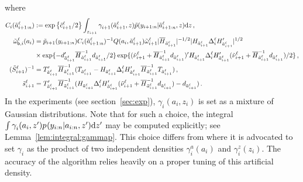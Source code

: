 where
\begin{align*}
C_i(\tilde{a}^{\ell}_{i+1:n}) &:= \exp \left\{\tilde{c}^{\ell}_{i+1}/2\right\}  \int_{z_{i+1}} \gamma^{}_{i+1}(\tilde{a}^{\ell}_{i+1}, z)\tilde{p}(y_{i+1:n}|\tilde{a}^{\ell}_{i+1:n},z) \mathrm{d} z\,,\\
\tilde{\omega}_{\mathsf{b},i}^\ell(a_i) &= \tilde{p}_{i+1}(y_{i+1:n})C_i(\tilde{a}^{\ell}_{i+1:n})^{-1}Q(a_i, \tilde{a}^{\ell}_{i+1}) \tilde{\omega}^{\ell}_{i+1} |\overline{H}_{\tilde{a}^{\ell}_{i+1}}|^{-1/2} |H_{\tilde{a}^{\ell}_{i+1}} \Delta^{\ell}_i H'_{\tilde{a}^{\ell}_{i+1}}|^{1/2}\\
&\times\exp\{-d'_{\tilde{a}^\ell_{i+1}}\overline{H}_{\tilde{a}^\ell_{i+1}}^{-1}d_{\tilde{a}^\ell_{i+1}}/2\}\exp\{(\tilde{\nu}^{\ell}_{i+1} + \overline{H}_{\tilde{a}^\ell_{i+1}}^{-1}d_{\tilde{a}^\ell_{i+1}})'H_{\tilde{a}^{\ell}_{i+1}}\Delta^{\ell}_iH'_{\tilde{a}^{\ell}_{i+1}}(\tilde{\nu}^{\ell}_{i+1} + \overline{H}_{\tilde{a}^\ell_{i+1}}^{-1}d_{\tilde{a}^\ell_{i+1}})/2\} \,,\\
(\tilde{S}_{i+1}^\ell)^{-1} &= T'_{\tilde{a}^{\ell}_{i+1}}\overline{H}_{\tilde{a}^\ell_{i+1}}^{-1}(T_{\tilde{a}^{\ell}_{i+1}}-H_{\tilde{a}^{\ell}_{i+1}}\Delta^{\ell}_iH'_{\tilde{a}^{\ell}_{i+1}}\overline{H}_{\tilde{a}^\ell_{i+1}}^{-1}T_{\tilde{a}^{\ell}_{i+1}})\,,\\
\tilde{s}_{i+1}^\ell &=T'_{\tilde{a}^{\ell}_{i+1}}\overline{H}_{\tilde{a}^\ell_{i+1}}^{-1}(H_{\tilde{a}^{\ell}_{i+1}}\Delta^{\ell}_iH'_{\tilde{a}^{\ell}_{i+1}}(\tilde{\nu}^{\ell}_{i+1} + \overline{H}_{\tilde{a}^\ell_{i+1}}^{-1}d_{\tilde{a}^\ell_{i+1}})-d_{\tilde{a}^\ell_{i+1}})\,.
\end{align*}
In the experiments (see section~\ref{sec:exp}), $\gamma^{}_i(a_i,z_i)$ is set as a mixture of Gaussian distributions. Note that for such a choice,
 the integral $\int \gamma^{}_{i}(a_i,z')p_{}(y_{i:n}|a_{i:n},z')\mathrm{d} z'$ may be computed explicitly; see Lemma~\ref{lem:integral:gammap}. This choice differs from \cite{briers:doucet:maskell:2010} where it is advocated to set $\gamma^{}_i$ as the product of two independent densities $\gamma_i^{a}(a_i)$ and $\gamma_i^{z}(z_i)$. The accuracy of the algorithm relies heavily on a proper tuning of this artificial density.%

